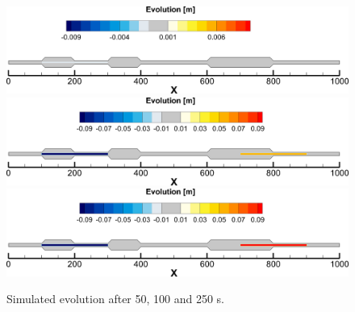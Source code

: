 \begin{figure} [!h]
\centering
\includegraphics[scale=0.15]{result50.png}
\includegraphics[scale=0.15]{result150.png}
\includegraphics[scale=0.15]{result250.png}
 \caption{Simulated evolution after 50, 100 and 250 s.}\label{result50}
\end{figure}


